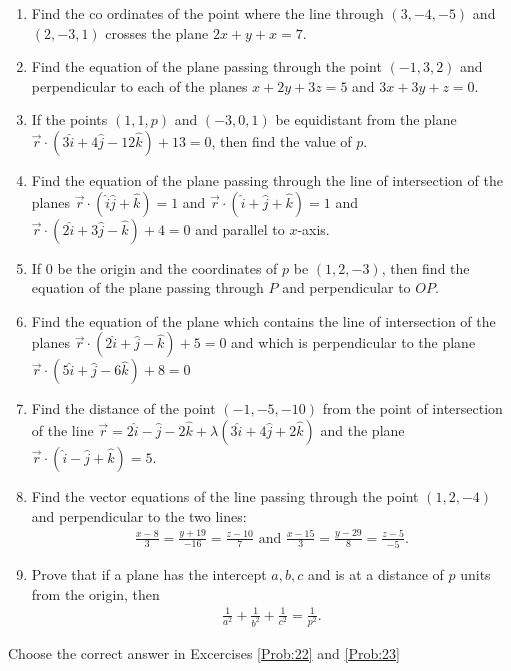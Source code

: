 \documentclass{article}
\theoremstyle{remark}
\begin{document}
\begin{enumerate}
\item Find the co ordinates of the point where the line through $(3,-4,-5)$ and $(2,-3,1)$ crosses the plane $2x+y+x=7$.
\item Find the equation of the plane passing through the point $(-1,3,2)$ and perpendicular to each of the planes $x+2y+3z=5$ and $3x+3y+z=0$.
\item If the points $(1,1,p)$ and $(-3,0,1)$ be equidistant from the plane $\overrightarrow{r}\cdot(3\hat{i}+4\hat{j}-12\hat{k})+13=0$, then find the value of $p$.
\item Find the equation of the plane passing through the line of intersection of the planes $\overrightarrow{r}\cdot(\hat{i}\hat{j}+\hat{k})=1$ and $\overrightarrow{r}\cdot(\hat{i}+\hat{j}+\hat{k})=1$ and $\overrightarrow{r}\cdot(2\hat{i}+3\hat{j}-\hat{k})+4=0$ and parallel to $x$-axis.
\item If $0$ be the origin and the coordinates of $p$ be $(1,2,-3)$, then find the equation of the plane passing through $P$ and perpendicular to $OP$.
\item Find the equation of the plane which contains the line of intersection of the planes $\overrightarrow{r}\cdot(2\hat{i}+\hat{j}-\hat{k})+5=0$ and which is perpendicular to the plane $\overrightarrow{r}\cdot(5\hat{i}+\hat{j}-6\hat{k})+8=0$
\item Find the distance of the point $(-1,-5,-10)$ from the point of intersection of the line $\overrightarrow{r}=2\hat{i}-\hat{j}-2\hat{k}+\lambda(3\hat{i}+4\hat{j}+2\hat{k})$ and the plane $\overrightarrow{r}\cdot(\hat{i}-\hat{j}+\hat{k})=5$.
\item Find the vector equations of the line passing through the point $(1,2,-4)$ and perpendicular to the two lines:
\begin{align}
\frac{x-8}{3}=\frac{y+19}{-16}=\frac{z-10}{7}\text{ and } \frac{x-15}{3}=\frac{y-29}{8}=\frac{z-5}{-5}.
\end{align}
\item Prove that if a plane has the intercept $a,b,c$ and is at a distance of $p$ units  from the origin, then
\begin{align}
\frac{1}{a^2}+\frac{1}{b^2}+\frac{1}{c^2}=\frac{1}{p^2}.
\end{align}
\end{enumerate}
Choose the correct answer in Excercises \ref{Prob:22} and \ref{Prob:23}
\end{document}
